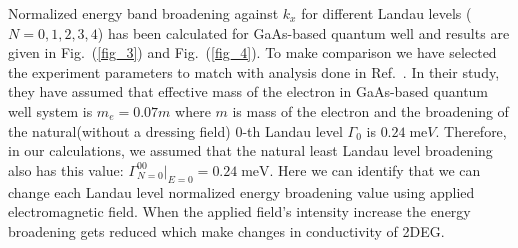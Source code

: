 Normalized energy band broadening against ${k_x}$ for different Landau levels ($N = 0,1,2,3,4$) has been calculated for GaAs-based quantum well and results are given in Fig.~(\ref{fig_3}) and Fig.~(\ref{fig_4}). To make comparison we have selected the experiment parameters to match with analysis done in Ref.~\cite{endo09}.
In their study, they have assumed that effective mass of the electron in GaAs-based quantum well system is $m_e = 0.07m$ where $m$ is mass of the electron \cite{endo09,winkler03,wackerl20} and the broadening of the natural(without a dressing field) $0$-th Landau level $\Gamma_0$ is $0.24\;\text{me}V$. Therefore, in our calculations, we assumed that the natural least Landau level broadening also has this value: $\Gamma^{00}_{N=0}|_{E=0} = 0.24 \;\text{meV}$.
Here we can identify that we can change each Landau level normalized energy broadening value using applied electromagnetic field. When the applied field's intensity increase the energy broadening gets reduced which make changes in conductivity of 2DEG.
